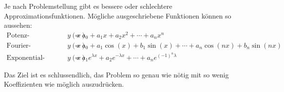 Je nach Problemstellung gibt es bessere oder schlechtere Approximationsfunktionen.
Mögliche ausgeschriebene Funktionen können so aussehen:
\begin{equation}
	\begin{aligned}
		\text{Potenz-Entwicklung: }
		y(x)
		&=
		a_0+a_1 x+a_2 x^2+\cdots+a_n x^n \\
		\text{Fourier-Entwicklung: } 
		y(x)
		&=
		a_0+a_1\cos(x)+b_1\sin(x)+\cdots+a_n\cos(n x)+b_n\sin(n x)\\
		\text{Exponential-Entwicklung: } 
		y(x)
		&=
		a_1 e^{\lambda x}+a_2 e^{-\lambda x}+\cdots+a_n e^{(-1)^n \lambda}
	\end{aligned}
\label{antennen:approxFunktBsp}
\end{equation}

Das Ziel ist es schlussendlich, das Problem so genau wie nötig mit so wenig
Koeffizienten wie möglich auszudrücken.

